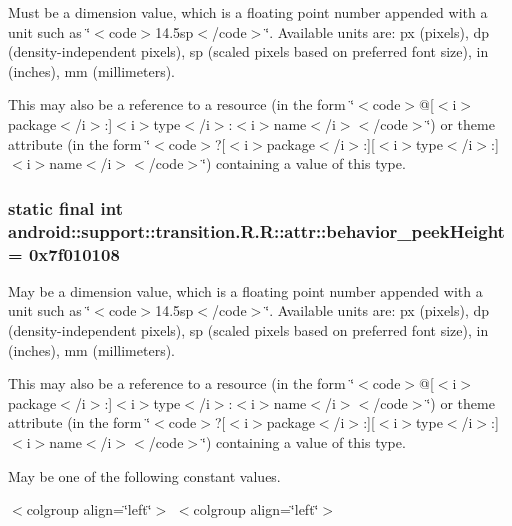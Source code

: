 Must be a dimension value, which is a floating point number appended with a unit such as \char`\"{}$<$code$>$14.5sp$<$/code$>$\char`\"{}. Available units are: px (pixels), dp (density-independent pixels), sp (scaled pixels based on preferred font size), in (inches), mm (millimeters). 

This may also be a reference to a resource (in the form \char`\"{}$<$code$>$@\mbox{[}$<$i$>$package$<$/i$>$:\mbox{]}$<$i$>$type$<$/i$>$:$<$i$>$name$<$/i$>$$<$/code$>$\char`\"{}) or theme attribute (in the form \char`\"{}$<$code$>$?\mbox{[}$<$i$>$package$<$/i$>$:\mbox{]}\mbox{[}$<$i$>$type$<$/i$>$:\mbox{]}$<$i$>$name$<$/i$>$$<$/code$>$\char`\"{}) containing a value of this type. \hypertarget{classandroid_1_1support_1_1transition_1_1_r_1_1attr_67b9c8c5bb1e4b83130ca3a7dada304e}{
\subsubsection[{behavior\_\-peekHeight}]{\setlength{\rightskip}{0pt plus 5cm}static final int android::support::transition.R.R::attr::behavior\_\-peekHeight = 0x7f010108}}
\label{classandroid_1_1support_1_1transition_1_1_r_1_1attr_67b9c8c5bb1e4b83130ca3a7dada304e}


May be a dimension value, which is a floating point number appended with a unit such as \char`\"{}$<$code$>$14.5sp$<$/code$>$\char`\"{}. Available units are: px (pixels), dp (density-independent pixels), sp (scaled pixels based on preferred font size), in (inches), mm (millimeters). 

This may also be a reference to a resource (in the form \char`\"{}$<$code$>$@\mbox{[}$<$i$>$package$<$/i$>$:\mbox{]}$<$i$>$type$<$/i$>$:$<$i$>$name$<$/i$>$$<$/code$>$\char`\"{}) or theme attribute (in the form \char`\"{}$<$code$>$?\mbox{[}$<$i$>$package$<$/i$>$:\mbox{]}\mbox{[}$<$i$>$type$<$/i$>$:\mbox{]}$<$i$>$name$<$/i$>$$<$/code$>$\char`\"{}) containing a value of this type. 

May be one of the following constant values. \begin{TabularC}{0}
\hline
\end{TabularC}
$<$colgroup align=\char`\"{}left\char`\"{}$>$ $<$colgroup align=\char`\"{}left\char`\"{}$>$ 

